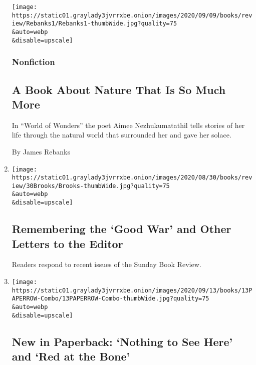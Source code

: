 \begin{enumerate}
  \texttt{[image: https://static01.graylady3jvrrxbe.onion/images/2020/09/09/books/review/Rebanks1/Rebanks1-thumbWide.jpg?quality=75\\\&auto=webp\\\&disable=upscale]}

  \hypertarget{nonfiction-5}{%
  \subsubsection{Nonfiction}\label{nonfiction-5}}

  \hypertarget{a-book-about-nature-that-is-so-much-more}{%
  \subsection{A Book About Nature That Is So Much
  More}\label{a-book-about-nature-that-is-so-much-more}}

  In ``World of Wonders'' the poet Aimee Nezhukumatathil tells stories
  of her life through the natural world that surrounded her and gave her
  solace.

  By James Rebanks
\item
  \href{/2020/09/11/books/review/remembering-the-good-war-and-other-letters-to-the-editor.html}{}

  \texttt{[image: https://static01.graylady3jvrrxbe.onion/images/2020/08/30/books/review/30Brooks/Brooks-thumbWide.jpg?quality=75\\\&auto=webp\\\&disable=upscale]}

  \hypertarget{remembering-the-good-war-and-other-letters-to-the-editor}{%
  \subsection{Remembering the `Good War' and Other Letters to the
  Editor}\label{remembering-the-good-war-and-other-letters-to-the-editor}}

  Readers respond to recent issues of the Sunday Book Review.
\item
  \href{/2020/09/11/books/review/new-paperbacks.html}{}

  \texttt{[image: https://static01.graylady3jvrrxbe.onion/images/2020/09/13/books/13PAPERROW-Combo/13PAPERROW-Combo-thumbWide.jpg?quality=75\\\&auto=webp\\\&disable=upscale]}

  \hypertarget{new-in-paperback-nothing-to-see-here-and-red-at-the-bone}{%
  \subsection{New in Paperback: `Nothing to See Here' and `Red at the
  Bone'}\label{new-in-paperback-nothing-to-see-here-and-red-at-the-bone}}


\end{enumerate}
